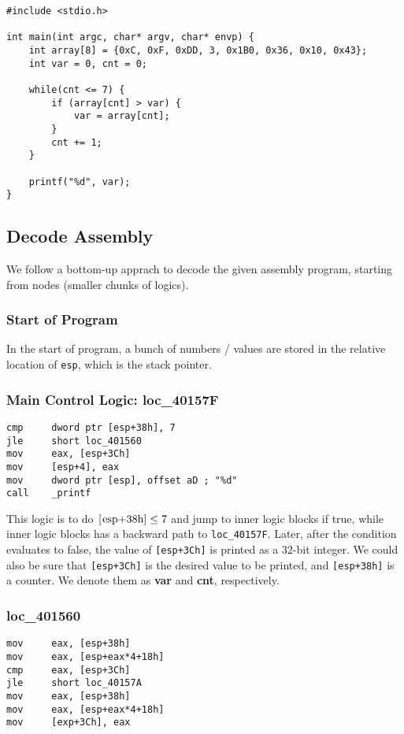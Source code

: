 \documentclass[11pt]{article}
\begin{document}
\begin{lstlisting}[style=CStyle]
#include <stdio.h>

int main(int argc, char* argv, char* envp) {
    int array[8] = {0xC, 0xF, 0xDD, 3, 0x1B0, 0x36, 0x10, 0x43};
    int var = 0, cnt = 0;

    while(cnt <= 7) {
        if (array[cnt] > var) {
            var = array[cnt];
        }
        cnt += 1;
    }

    printf("%d", var);
}
\end{lstlisting}

\subsection{Decode Assembly}

We follow a bottom-up apprach to decode the given assembly program, starting from nodes (smaller chunks of logics).
\subsubsection{Start of Program}\label{sec:2.2.1}
In the start of program, a bunch of numbers / values are stored in the relative location of \lstinline{esp}, which is the stack pointer. 

\subsubsection{Main Control Logic: loc\_40157F}
\begin{lstlisting}[language={[x86masm]Assembler}]
cmp     dword ptr [esp+38h], 7
jle     short loc_401560
mov     eax, [esp+3Ch]
mov     [esp+4], eax
mov     dword ptr [esp], offset aD ; "%d"
call    _printf
\end{lstlisting}

This logic is to do $\lstinline{[esp+38h]} \leq 7$ and jump to inner logic blocks if true, while inner logic blocks has a backward path to \lstinline{loc_40157F}. Later, after the condition evaluates to false, the value of \lstinline{[esp+3Ch]} is printed as a 32-bit integer. We could also be sure that \lstinline{[esp+3Ch]} is the desired value to be printed, and \lstinline{[esp+38h]} is a counter. We denote them as \textbf{var} and \textbf{cnt}, respectively. 

\subsubsection{loc\_401560}
\begin{lstlisting}[language={[x86masm]Assembler}]
mov     eax, [esp+38h]
mov     eax, [esp+eax*4+18h]
cmp     eax, [esp+3Ch]
jle     short loc_40157A
mov     eax, [esp+38h]
mov     eax, [esp+eax*4+18h]
mov     [exp+3Ch], eax
\end{lstlisting}
\end{document}
